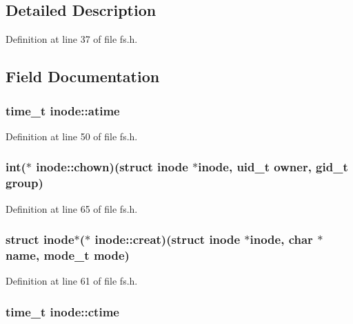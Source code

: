 \subsection{Detailed Description}


Definition at line 37 of file fs.\+h.



\subsection{Field Documentation}
\hypertarget{structinode_a7e52661a115f6def97778566f2be0d80}{
\subsubsection[{atime}]{\setlength{\rightskip}{0pt plus 5cm}time\+\_\+t inode\+::atime}}\label{structinode_a7e52661a115f6def97778566f2be0d80}


Definition at line 50 of file fs.\+h.

\hypertarget{structinode_a8221183a697c9f2b4e0e295f5a9d8afd}{
\subsubsection[{chown}]{\setlength{\rightskip}{0pt plus 5cm}int($\ast$ inode\+::chown)(struct {\bf inode} $\ast${\bf inode}, uid\+\_\+t owner, gid\+\_\+t group)}}\label{structinode_a8221183a697c9f2b4e0e295f5a9d8afd}


Definition at line 65 of file fs.\+h.

\hypertarget{structinode_ad622a049b34780786d9ba4311b06b3b4}{
\subsubsection[{creat}]{\setlength{\rightskip}{0pt plus 5cm}struct {\bf inode}$\ast$($\ast$ inode\+::creat)(struct {\bf inode} $\ast${\bf inode}, char $\ast${\bf name}, mode\+\_\+t {\bf mode})}}\label{structinode_ad622a049b34780786d9ba4311b06b3b4}


Definition at line 61 of file fs.\+h.

\hypertarget{structinode_a27334a9d3c25fbac1c134ed5b9cbc566}{
\subsubsection[{ctime}]{\setlength{\rightskip}{0pt plus 5cm}time\+\_\+t inode\+::ctime}}\label{structinode_a27334a9d3c25fbac1c134ed5b9cbc566}


